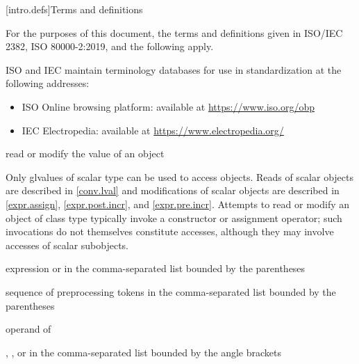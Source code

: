 [intro.defs]{Terms and definitions}

\pnum
{}%
For the purposes of this document,
the terms and definitions
given in ISO/IEC 2382, ISO 80000-2:2019,
and the following apply.

\pnum
ISO and IEC maintain terminology databases
for use in standardization
at the following addresses:
\begin{itemize}
\item ISO Online browsing platform: available at \url{https://www.iso.org/obp}
\item IEC Electropedia: available at \url{https://www.electropedia.org/}
\end{itemize}

%
read or modify the value of an object

\begin{defnote}
Only glvalues of scalar type can be used to access objects.
Reads of scalar objects are described in \ref{conv.lval} and
modifications of scalar objects are described in
\ref{expr.assign}, \ref{expr.post.incr}, and \ref{expr.pre.incr}.
Attempts to read or modify an object of class type
typically invoke a constructor
or assignment operator;
such invocations do not themselves constitute accesses,
although they may involve accesses of scalar subobjects.
\end{defnote}

%
expression or 
in the comma-separated list bounded by the parentheses

%
%
 sequence of preprocessing tokens in the
comma-separated list bounded by the parentheses

%
%
 operand of 

%
%
,
, or
 in the comma-separated
list bounded by the angle brackets

